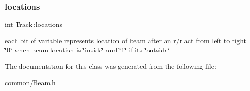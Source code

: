 \subsubsection{\texorpdfstring{locations}{locations}}
{\footnotesize\ttfamily int Track\+::locations}

each bit of variable represents location of beam after an r/r act from left to right \char`\"{}0\char`\"{} when beam location is \char`\"{}inside\char`\"{} and \char`\"{}1\char`\"{} if it\textquotesingle{}s \char`\"{}outside\char`\"{} 

The documentation for this class was generated from the following file\+:\begin{DoxyCompactItemize}
\item 
common/Beam.\+h\end{DoxyCompactItemize}
